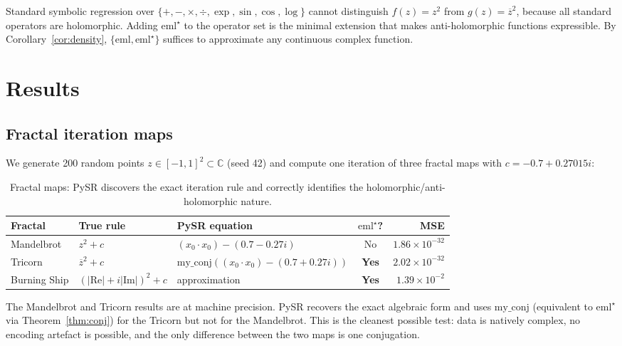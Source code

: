 \documentclass[12pt,a4paper]{article}
\newcommand{\emlstar}{\mathrm{eml}^{\star}}
\newcommand{\eml}{\mathrm{eml}}
\newcommand{\conj}[1]{\overline{#1}}
\begin{document}
Standard symbolic regression over $\{+,-,\times,\div,\exp,\sin,\cos,\log\}$
cannot distinguish $f(z) = z^2$ from $g(z) = \conj{z}^2$, because
all standard operators are holomorphic.
Adding $\emlstar$ to the operator set is the minimal extension that
makes anti-holomorphic functions expressible.
By Corollary~\ref{cor:density}, $\{\eml, \emlstar\}$ suffices
to approximate any continuous complex function.


\section{Results}
\label{sec:results}

\subsection{Fractal iteration maps}
\label{sec:fractals}

We generate 200 random points $z \in [-1,1]^2 \subset \mathbb{C}$
(seed 42) and compute one iteration of three fractal maps with
$c = -0.7 + 0.27015i$:

\begin{table}[h]
\centering
\caption{Fractal maps: PySR discovers the exact iteration rule
and correctly identifies the holomorphic/anti-holomorphic nature.}
\label{tab:fractals}
\begin{tabular}{lllcr}
\toprule
Fractal & True rule & PySR equation & $\emlstar$? & MSE \\
\midrule
Mandelbrot & $z^2 + c$ & $(x_0 \cdot x_0) - (0.7 - 0.27i)$ & No & $1.86 \times 10^{-32}$ \\
Tricorn & $\conj{z}^2 + c$ & $\mathrm{my\_conj}((x_0 \cdot x_0) - (0.7 + 0.27i))$ & \textbf{Yes} & $2.02 \times 10^{-32}$ \\
Burning Ship & $(|\mathrm{Re}|+i|\mathrm{Im}|)^2+c$ & approximation & \textbf{Yes} & $1.39 \times 10^{-2}$ \\
\bottomrule
\end{tabular}
\end{table}

The Mandelbrot and Tricorn results are at machine precision.
PySR recovers the exact algebraic form and uses $\mathrm{my\_conj}$
(equivalent to $\emlstar$ via Theorem~\ref{thm:conj}) for the Tricorn
but not for the Mandelbrot.
This is the cleanest possible test: data is natively complex,
no encoding artefact is possible, and the only difference between
the two maps is one conjugation.
\end{document}

